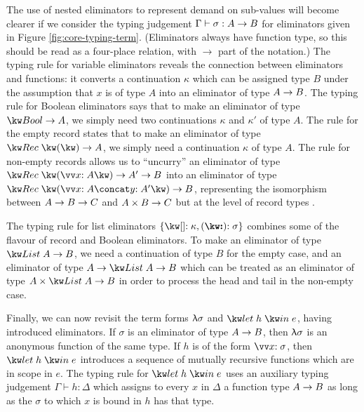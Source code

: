 The use of nested eliminators to represent demand on sub-values will become clearer if we consider the typing judgement $\Gamma \vdash \sigma: {A}\rightarrow{B}$ for eliminators given in Figure \ref{fig:core-typing-term}. (Eliminators always have function type, so this should be read as a four-place relation, with $\to$ part of the notation.) The typing rule for variable eliminators reveals the connection between eliminators and functions: it converts a continuation $\kappa$ which can be assigned type $B$ under the assumption that $x$ is of type $A$ into an eliminator of type ${A}\rightarrow{B}$. The typing rule for Boolean eliminators says that to make an eliminator of type $\tyFun{\tyBool}{A}$, we simply need two continuations $\kappa$ and $\kappa'$ of type $A$. The rule for the empty record states that to make an eliminator of type $\tyFun{\tyRec{}}{A}$, we simply need a continuation $\kappa$ of type $A$. The rule for non-empty records allows us to ``uncurry'' an eliminator of type $\tyFun{\tyRec{\vec{\bind{x}{A}}}}{\tyFun{A'}{B}}$ into an eliminator of type $\tyFun{\tyRec{\vec{\bind{x}{A}} \concat \bind{y}{A'}}}{B}$, representing the isomorphism between ${{A}\rightarrow{B}}\rightarrow{C}$ and ${{A}\times{B}}\rightarrow{C}$ but at the level of record types \cite{hinze00}.

The typing rule for list eliminators $\elimList{\kappa}{\sigma}$ combines some of the flavour of record and Boolean eliminators. To make an eliminator of type $\tyFun{\tyList{A}}{B}$, we need a continuation of type $B$ for the empty case, and an eliminator of type $\tyFun{A}{\tyFun{\tyList{A}}{B}}$ which can be treated as an eliminator of type $\tyFun{\tyProd{A}{\tyList{A}}}{B}$ in order to process the head and tail in the non-empty case.

Finally, we can now revisit the term forms $\uplambda{\sigma}$ and $\exLetRecMutual{h}{e}$, having introduced eliminators. If $\sigma$ is an eliminator of type ${A}\rightarrow{B}$, then $\uplambda{\sigma}$ is an anonymous function of the same type. If $h$ is of the form $\vec{\bind{x}{\sigma}}$, then $\exLetRecMutual{h}{e}$ introduces a sequence of mutually recursive functions which are in scope in $e$. The typing rule for $\exLetRecMutual{h}{e}$ uses an auxiliary typing judgement $\Gamma \vdash h : \Delta$ which assigns to every $x$ in $\Delta$ a function type ${A}\rightarrow{B}$ as long as the $\sigma$ to which $x$ is bound in $h$ has that type.




